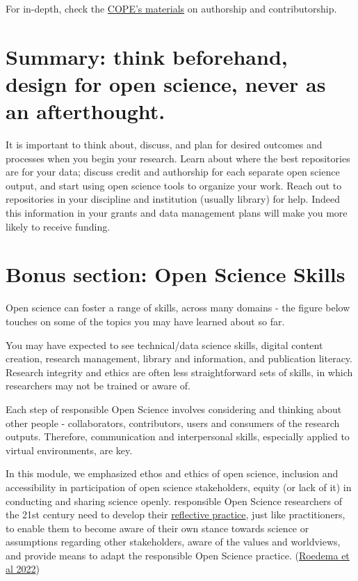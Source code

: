 \documentclass[
  letterpaper,
  DIV=11,
  numbers=noendperiod]{scrreport}
\begin{document}
For in-depth, check the
\href{https://publicationethics.org/authorship}{COPE's materials} on
authorship and contributorship.

\hypertarget{summary-think-beforehand-design-for-open-science-never-as-an-afterthought.}{%
\section{Summary: think beforehand, design for open science, never as an
afterthought.}\label{summary-think-beforehand-design-for-open-science-never-as-an-afterthought.}}

It is important to think about, discuss, and plan for desired outcomes
and processes when you begin your research. Learn about where the best
repositories are for your data; discuss credit and authorship for each
separate open science output, and start using open science tools to
organize your work. Reach out to repositories in your discipline and
institution (usually library) for help. Indeed this information in your
grants and data management plans will make you more likely to receive
funding.

\hypertarget{bonus-section-open-science-skills}{%
\section{Bonus section: Open Science
Skills}\label{bonus-section-open-science-skills}}

Open science can foster a range of skills, across many domains - the
figure below touches on some of the topics you may have learned about so
far.

You may have expected to see technical/data science skills, digital
content creation, research management, library and information, and
publication literacy. Research integrity and ethics are often less
straightforward sets of skills, in which researchers may not be trained
or aware of.

Each step of responsible Open Science involves considering and thinking
about other people - collaborators, contributors, users and consumers of
the research outputs. Therefore, communication and interpersonal skills,
especially applied to virtual environments, are key.

In this module, we emphasized ethos and ethics of open science,
inclusion and accessibility in participation of open science
stakeholders, equity (or lack of it) in conducting and sharing science
openly. responsible Open Science researchers of the 21st century need to
develop their
\href{https://libguides.cam.ac.uk/reflectivepracticetoolkit/whatisreflectivepractice}{reflective
practice}, just like practitioners, to enable them to become aware of
their own stance towards science or assumptions regarding other
stakeholders, aware of the values and worldviews, and provide means to
adapt the responsible Open Science practice.
(\href{https://doi.org/10.22323/2.21040202}{Roedema et al 2022})
\end{document}
